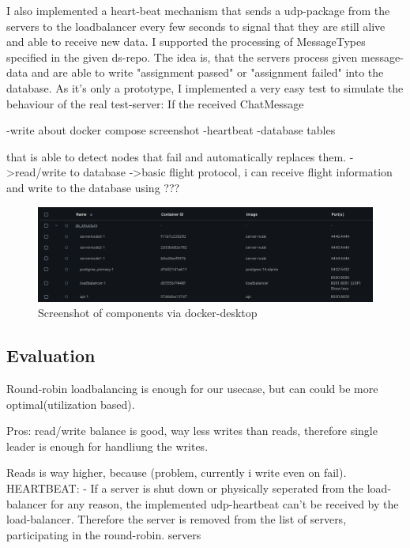 \documentclass{article}
\begin{document}
I also implemented  a heart-beat mechanism that sends a udp-package from the servers to the loadbalancer every few seconds to signal that they are still alive and able to receive new data. 
I supported the processing of MessageTypes specified in the given ds-repo. 
The idea is, that the servers process given message-data and are able to write "assignment passed" or "assignment failed" into the database.
As it's only a prototype, I implemented a very easy test to simulate the behaviour of the real test-server:
If the received ChatMessage 



-write about docker compose screenshot
-heartbeat
-database tables 



that is able to detect nodes that fail and automatically replaces them.
->read/write to database 
->basic flight protocol, i can receive flight information and write to the database using ???




\begin{figure}
    \centering
    \includegraphics[width=1\linewidth]{images/docker_compose_screenshot.png}
    \caption{Screenshot of components via docker-desktop}
    \label{fig:docker_compose}
\end{figure}








\subsection{Evaluation}
Round-robin loadbalancing is enough for our usecase, but can could be more optimal(utilization based).

Pros:
read/write balance is good, way less writes than reads, therefore single leader is enough for handliung the writes.

Reads is way higher, because (problem, currently i write even on fail). 
HEARTBEAT:
- If a server is shut down or physically seperated from the load-balancer for any reason, the implemented udp-heartbeat can't be received by the load-balancer. Therefore the server is removed from the list of servers, participating in the round-robin.
servers
\end{document}
